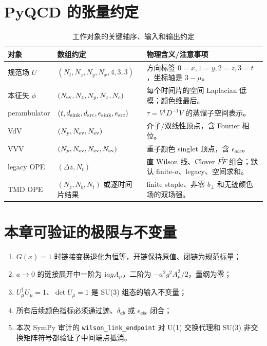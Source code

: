 \documentclass[UTF8,11pt,oneside]{ctexbook}
\newcommand{\ii}{\mathrm{i}}
\begin{document}
\section{PyQCD 的张量约定}
\begin{table}[htbp]
\centering
\caption{工作对象的关键轴序、输入和输出约定}
\small
\begin{tabularx}{0.96\textwidth}{@{}P{3.1cm}P{4.2cm}Y@{}}
\toprule
对象 & 数组约定 & 物理含义/注意事项\\
\midrule
规范场 \(U\) & \((N_t,N_z,N_y,N_x,4,3,3)\) & 方向标签 \(0=x,1=y,2=z,3=t\)，坐标轴是 \(3-\mu\)。\\
本征矢 \(\phi\) & \((N_{\rm ev},N_z,N_y,N_x,N_c)\) & 每个时间片的空间 Laplacian 低模；颜色维最后。\\
perambulator & \((t,d_{\rm sink},d_{\rm src},e_{\rm sink},e_{\rm src})\) & \(\tau=V^\dagger D^{-1}V\) 的蒸馏子空间表示。\\
VdV & \((N_p,N_{\rm ev},N_{\rm ev})\) & 介子/双线性顶点，含 Fourier 相位。\\
VVV & \((N_p,N_{\rm ev},N_{\rm ev},N_{\rm ev})\) & 重子颜色 singlet 顶点，含 \(\epsilon_{abc}\)。\\
legacy OPE & \((\Delta z,N_t)\) & 直 Wilson 线、Clover \(F\widetilde F\) 组合；默认 finite-\(a\)、legacy、空间求和。\\
TMD OPE & \((N_z,N_b,N_t)\) 或逐时间片结果 & finite staple、非零 \(b_\perp\) 和无迹颜色场的双场强。\\
\bottomrule
\end{tabularx}
\end{table}

\section{本章可验证的极限与不变量}
\begin{enumerate}
  \item \(G(x)=1\) 时链接变换退化为恒等，开链保持原值、闭链为规范标量；
  \item \(a\to0\) 的链接展开中一阶为 \(\ii agA_\mu\)，二阶为
  \(-a^2g^2A_\mu^2/2\)，量纲为零；
  \item \(U_\mu^\dagger U_\mu=1\)、\(\det U_\mu=1\) 是 SU(3) 组态的输入不变量；
  \item 所有后续颜色指标必须通过迹、\(\delta_{ab}\) 或 \(\epsilon_{abc}\) 闭合；
\item 本次 SymPy 审计的 \texttt{wilson\_link\_endpoint} 对 U(1) 交换代理和
  SU(3) 非交换矩阵符号都验证了中间端点抵消。
\end{enumerate}
\end{document}
